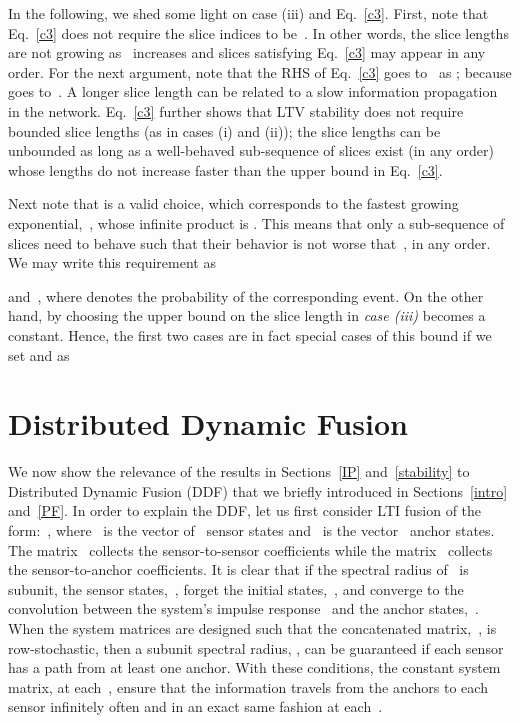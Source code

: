 \documentclass[draftclsnofoot, onecolumn, 12pt]{IEEEtran}
\begin{document}
In the following, we shed some light on case (iii) and Eq.~\eqref{c3}. First, note that Eq.~\eqref{c3} does not require the slice indices to be~. In other words, the slice lengths are not growing as~ increases and slices satisfying Eq.~\eqref{c3} may appear in any order. For the next argument, note that the RHS of Eq.~\eqref{c3} goes to~ as ; because  goes to~. A longer slice length can be related to a slow information propagation in the network. Eq.~\eqref{c3} further shows that LTV stability does not require bounded slice lengths (as in cases (i) and (ii)); the slice lengths can be unbounded as long as a well-behaved sub-sequence of slices exist (in any order) whose lengths do not increase faster than the upper bound in Eq.~\eqref{c3}. 

Next note that  is a valid choice, which corresponds to the fastest growing exponential,~, whose infinite product is . 
This means that only a sub-sequence of slices need to behave such that their behavior is not worse that~, in any order. We may write this requirement as 

 and~, where  denotes the probability of the corresponding event. On the other hand, by choosing  the upper bound on the slice length in \textit{case (iii)} becomes a constant. Hence, the first two cases are in fact special cases of this bound if we set  and  as



\section{Distributed Dynamic Fusion}\label{app}
We now show the relevance of the results in Sections~\ref{IP} and~\ref{stability} to Distributed Dynamic Fusion (DDF) that we briefly introduced in Sections~\ref{intro} and~\ref{PF}. In order to explain the DDF, let us first consider LTI fusion of the form:~, where~ is the vector of~ sensor states and~ is the vector~ anchor states. The matrix~ collects the sensor-to-sensor coefficients while the matrix~ collects the sensor-to-anchor coefficients. It is clear that if the spectral radius of~ is subunit, the sensor states,~, forget the initial states,~, and converge to the convolution between the system's impulse response~ and the anchor states,~. When the system matrices are designed such that the concatenated matrix,~, is row-stochastic, then a subunit spectral radius, , can be guaranteed if each sensor has a path from at least one anchor. With these conditions, the constant system matrix,  at each~, ensure that the information travels from the anchors to each sensor infinitely often and in an exact same fashion at each~. 
\end{document}
